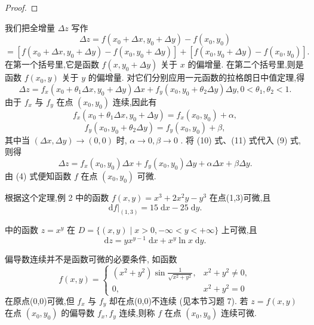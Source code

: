 \begin{proof}

\end{proof}
我们把全增量 \({\Delta z}\) 写作
\[
{\Delta z} = f\left( {{x}_{0} + {\Delta x},{y}_{0} + {\Delta y}}\right)  - f\left( {{x}_{0},{y}_{0}}\right)
\]
\[
= \left\lbrack  {f\left( {{x}_{0} + {\Delta x},{y}_{0} + {\Delta y}}\right)  - f\left( {{x}_{0},{y}_{0} + {\Delta y}}\right) }\right\rbrack   + \left\lbrack  {f\left( {{x}_{0},{y}_{0} + {\Delta y}}\right)  - f\left( {{x}_{0},{y}_{0}}\right) }\right\rbrack  .
\]
在第一个括号里,它是函数 \(f\left( {x,{y}_{0} + {\Delta y}}\right)\) 关于 \(x\) 的偏增量. 在第二个括号里,则是函数 \(f\left( {{x}_{0},y}\right)\) 关于 \(y\) 的偏增量. 对它们分别应用一元函数的拉格朗日中值定理,得
\[
{\Delta z} = {f}_{x}\left( {{x}_{0} + {\theta }_{1}{\Delta x},{y}_{0} + {\Delta y}}\right) {\Delta x} + {f}_{y}\left( {{x}_{0},{y}_{0} + {\theta }_{2}{\Delta y}}\right) {\Delta y},0 < {\theta }_{1},{\theta }_{2} < 1. \tag{9}
\]
由于 \({f}_{x}\) 与 \({f}_{y}\) 在点 \(\left( {{x}_{0},{y}_{0}}\right)\) 连续,因此有
\[
{f}_{x}\left( {{x}_{0} + {\theta }_{1}{\Delta x},{y}_{0} + {\Delta y}}\right)  = {f}_{x}\left( {{x}_{0},{y}_{0}}\right)  + \alpha , \tag{10}
\]
\[
{f}_{y}\left( {{x}_{0},{y}_{0} + {\theta }_{2}{\Delta y}}\right)  = {f}_{y}\left( {{x}_{0},{y}_{0}}\right)  + \beta , \tag{11}
\]
其中当 \(\left( {{\Delta x},{\Delta y}}\right)  \rightarrow  \left( {0,0}\right)\) 时, \(\alpha  \rightarrow  0,\beta  \rightarrow  0\) . 将 (10) 式、(11) 式代入 (9) 式,则得
\[
{\Delta z} = {f}_{x}\left( {{x}_{0},{y}_{0}}\right) {\Delta x} + {f}_{y}\left( {{x}_{0},{y}_{0}}\right) {\Delta y} + {\alpha \Delta x} + {\beta \Delta y}.
\]
由 (4) 式便知函数 \(f\) 在点 \(\left( {{x}_{0},{y}_{0}}\right)\) 可微.

根据这个定理,例 2 中的函数 \(f\left( {x,y}\right)  = {x}^{3} + 2{x}^{2}y - {y}^{3}\) 在点(1,3)可微,且
\[
{\left. \mathrm{d}f\right| }_{\left( 1,3\right) } = {15}\mathrm{\;d}x - {25}\mathrm{\;d}y.
\]
\begin{example}

\end{example}
中的函数 \(z = {x}^{y}\) 在 \(D = \{ \left( {x,y}\right)  \mid  x > 0, - \infty  < y <  + \infty \}\) 上可微,且
\[
\mathrm{d}z = y{x}^{y - 1}\mathrm{\;d}x + {x}^{y}\ln x\mathrm{\;d}y.
\]
\begin{remark}

\end{remark}
偏导数连续并不是函数可微的必要条件, 如函数
\[
f\left( {x,y}\right)  = \left\{  \begin{matrix} \left( {{x}^{2} + {y}^{2}}\right) \sin \frac{1}{\sqrt{{x}^{2} + {y}^{2}}}, & {x}^{2} + {y}^{2} \neq  0, \\  0, & {x}^{2} + {y}^{2} = 0 \end{matrix}\right.
\]
在原点(0,0)可微,但 \({f}_{x}\) 与 \({f}_{y}\) 却在点(0,0)不连续 (见本节习题 7). 若 \(z = f\left( {x,y}\right)\) 在点 \(\left( {{x}_{0},{y}_{0}}\right)\) 的偏导数 \({f}_{x},{f}_{y}\) 连续,则称 \(f\) 在点 \(\left( {{x}_{0},{y}_{0}}\right)\) 连续可微.

